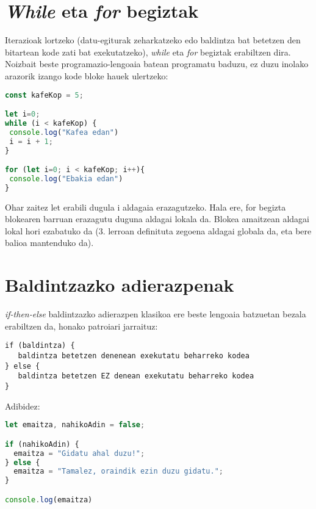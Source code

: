 \section{\textit{While} eta \textit{for} begiztak}

Iterazioak lortzeko (datu-egiturak zeharkatzeko edo baldintza bat betetzen den bitartean kode zati bat exekutatzeko), \textit{while} eta \textit{for} begiztak erabiltzen dira. Noizbait beste programazio-lengoaia batean programatu baduzu, ez duzu inolako arazorik izango kode bloke hauek ulertzeko:

\begin{minipage}{\linewidth}
\begin{lstlisting}[language=JavaScript]
const kafeKop = 5;

let i=0;
while (i < kafeKop) {
 console.log("Kafea edan")
 i = i + 1;
}

for (let i=0; i < kafeKop; i++){
 console.log("Ebakia edan")
}
\end{lstlisting}
\end{minipage}

Ohar zaitez let erabili dugula i aldagaia erazagutzeko. Hala ere, for begizta blokearen barruan erazagutu duguna aldagai lokala da. Blokea amaitzean aldagai lokal hori ezabatuko da (3. lerroan definituta zegoena aldagai globala da, eta bere balioa mantenduko da).

\section{Baldintzazko adierazpenak}
\textit{if-then-else} baldintzazko adierazpen klasikoa ere beste lengoaia batzuetan bezala erabiltzen da, honako patroiari jarraituz:

\begin{verbatim}
if (baldintza) {
   baldintza betetzen denenean exekutatu beharreko kodea
} else {
   baldintza betetzen EZ denean exekutatu beharreko kodea
}
\end{verbatim}

Adibidez:

\begin{minipage}{\linewidth}
\begin{lstlisting}[language=JavaScript]
let emaitza, nahikoAdin = false;

if (nahikoAdin) {
  emaitza = "Gidatu ahal duzu!";
} else {
  emaitza = "Tamalez, oraindik ezin duzu gidatu.";
}

console.log(emaitza)
\end{lstlisting}
\end{minipage}

